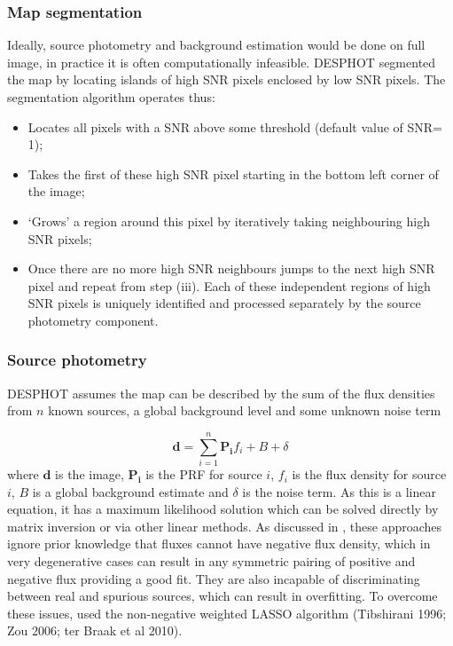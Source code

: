 \documentclass[useAMS,usenatbib]{mn2e}
\begin{document}
\subsubsection{Map segmentation}
Ideally, source photometry and background estimation would be done on full image, in practice it is often computationally infeasible. DESPHOT segmented the map by locating islands of high SNR pixels enclosed by low SNR pixels. The segmentation algorithm operates thus:
\begin{itemize}
\item Locates all pixels with a SNR above some threshold (default value of SNR= 1);
\item Takes the first of these high SNR pixel starting in the bottom left corner of the image;
\item `Grows' a region around this pixel by iteratively taking neighbouring high SNR pixels;
\item Once there are no more high SNR neighbours jumps to the next high SNR pixel and repeat from step (iii).
Each of these independent regions of high SNR pixels is uniquely identified and processed separately by the source photometry component.
\end{itemize}
\subsubsection{Source photometry}
DESPHOT assumes the map can be described by the sum of the flux densities from $n$ known sources, a global background level and some unknown noise term

\begin{equation}
\mathbf{d} = \sum\limits_{i=1}^n \mathbf{P_i}f_i + B + \delta
\label{eq:map}
\end{equation}
where $\mathbf{d}$ is the image, $\mathbf{P_i}$ is the PRF for source $i$, $f_i$ is the flux density for source $i$, $B$ is a global background estimate and $\delta$ is the noise term. As this is a linear equation, it has a maximum likelihood solution which can be solved directly by matrix inversion or via other linear methods. As discussed in \cite{Roseboom:2010, Roseboom:2011, Wang:2014}, these approaches ignore prior knowledge that fluxes cannot have negative flux density, which in very degenerative cases can result in any symmetric pairing of positive and negative flux providing a good fit. They are also incapable of discriminating between real and spurious sources, which can result in overfitting. To overcome these issues, \cite{Roseboom:2011} used the non-negative weighted LASSO algorithm (Tibshirani 1996; Zou 2006; ter Braak et al 2010).
\end{document}

